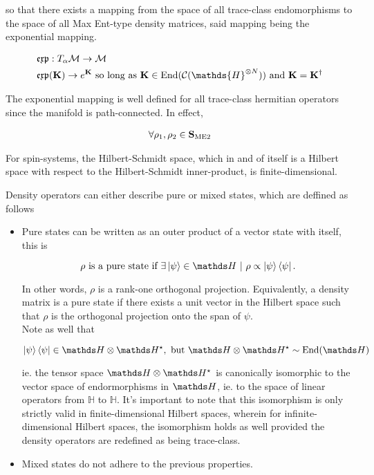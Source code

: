\documentclass{homework}
\begin{document}
so that there exists a mapping from the space of all trace-class endomorphisms to the space of all Max Ent-type density matrices, said mapping being the exponential mapping.

\begin{align*}
    &\mathfrak{e}\mathfrak{x}\mathfrak{p}: T_{\alpha} \mathcal{M} \rightarrow \mathcal{M} \\
    &\mathfrak{e}\mathfrak{x}\mathfrak{p}({\bf K}) \rightarrow e^{{\bf K}} \textnormal{ so long as } {\bf K} \in \textnormal{End}(\mathcal{C}(\mathds{H}^{\otimes N})) \textnormal{ and } {\bf K} = {\bf K}^{\dagger}
\end{align*}

The exponential mapping is well defined for all trace-class hermitian operators since the manifold is path-connected. In effect, 


\begin{align}
    \forall \rho_1, \rho_2 \in \mathcal{\bf S}_{\textnormal{ME2}}     
\end{align}

\clearpage 

For spin-systems, the Hilbert-Schmidt space, which in and of itself is a Hilbert space with respect to the Hilbert-Schmidt inner-product, is finite-dimensional. 

\clearpage

Density operators can either describe pure or mixed states, which are deffined as follows 

\begin{itemize}
    \item Pure states can be written as an outer product of a vector state with itself, this is 
    
    $$
    \rho \textnormal{ is a pure state if } \exists \ket{\psi} \in \hilbert \blanky | \blanky \rho \propto \ket{\psi} \bra{\psi}. 
    $$
    
    In other words, $\rho$ is a rank-one orthogonal projection. Equivalently, a density matrix is a pure state if there exists a unit vector in the Hilbert space such that $\rho$ is the orthogonal projection onto the span of $\psi$. \\
    
    Note as well that 
    
    $$
       \ket{\psi} \bra{\psi} \in \hilbert \otimes \hilbert^{\star}, \textnormal{ but } \hilbert \otimes \hilbert^{\star} \sim \textnormal{End}(\hilbert)
    $$
    
    ie. the tensor space $\hilbert \otimes \hilbert^{\star}$ is canonically isomorphic to the vector space of endormorphisms in $\hilbert$, ie. to the space of linear operators from $\mathds{H}$ to $\mathds{H}$.
    It's important to note that this isomorphism is only strictly valid in finite-dimensional Hilbert spaces, wherein for infinite-dimensional Hilbert spaces, the isomorphism holds as well provided the density operators are redefined as being trace-class.
    \item Mixed states do not adhere to the previous properties. 
\end{itemize}
\end{document}

